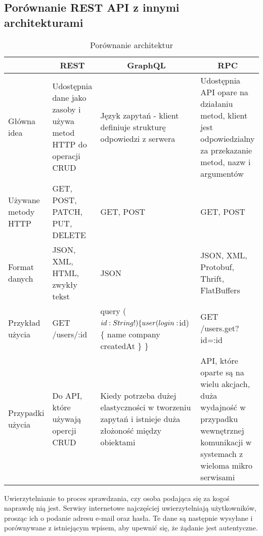 	\subsection{Porównanie REST API z innymi architekturami}

\begin{table}[H]
	\begin{tabular}{ |p{2cm}|p{4cm}|p{4cm}|p{4cm}| } 
		\hline
		\rowcolor{lightgray}
		\multicolumn{1}{|c|}{-} & \multicolumn{1}{|c|}{REST} & \multicolumn{1}{|c|}{GraphQL} & \multicolumn{1}{|c|}{RPC} \\
		\hline
		Główna idea & Udostępnia dane jako zasoby i używa metod HTTP do operacji CRUD & Język zapytań - klient definiuje strukturę odpowiedzi z serwera & Udostępnia API opare na działaniu metod, klient jest odpowiedzialny za przekazanie metod, nazw i argumentów  \\
		\hline
		Używane metody HTTP & GET, POST, PATCH, PUT, DELETE & GET, POST & GET, POST \\
		\hline
		Format danych & JSON, XML, HTML, zwykły tekst & JSON & JSON, XML, Protobuf, Thrift, FlatBuffers \\
		\hline
		Przykład użycia & GET /users/:id  & query ($id: String!) \{ \newline
		user(login: $id) \{ \newline
		name \newline
		company \newline
		createdAt \newline
		\} \newline
		\} & GET /users.get?id=:id \\
		\hline
		Przypadki użycia & Do API, które używają opercji CRUD & Kiedy potrzeba dużej elastyczności w tworzeniu zapytań i istnieje duża złożoność między obiektami &   API, które oparte są na wielu akcjach, duża wydajność w przypadku wewnętrznej komunikacji w systemach z wieloma mikro serwisami \\
		\hline
	\end{tabular}
	\caption{\label{tab:Porównanie architektur} Porównanie architektur}
\end{table}

Uwierzytelnianie to proces sprawdzania, czy osoba podająca się za kogoś naprawdę nią jest. Serwisy internetowe najczęściej uwierzytelniają użytkowników, prosząc ich o podanie adresu e-mail oraz hasła. Te dane są następnie wysyłane i porównywane z istniejącym wpisem, aby upewnić się, że żądanie jest autentyczne. 


